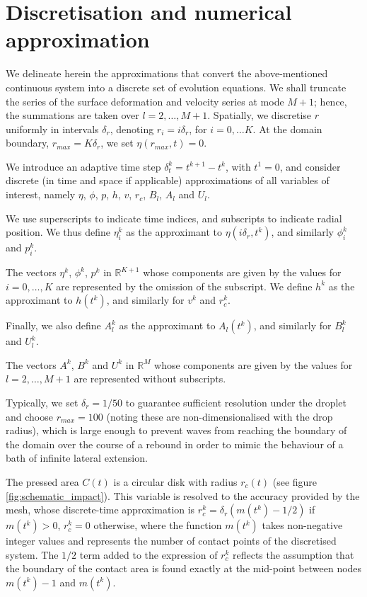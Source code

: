 \documentclass{jfm}
\begin{document}
\section{Discretisation and numerical approximation}
\label{sec:discretised_model}
We delineate herein the approximations that convert the above-mentioned continuous system into a discrete set of evolution equations. We shall truncate the series of the surface deformation and velocity series at mode $M+1$; hence, the summations are taken over $l=2,\ldots,M+1$. Spatially, we discretise $r$  uniformly in intervals $\delta_r$, denoting $r_i=i \delta_r$, for $i=0,\ldots K$. At the domain boundary, $r_{max} = K \delta_r$,  we set $\eta(r_{max}, t) = 0$.

We introduce an adaptive time step $\delta^k_t = t^{k+1} - t^{k}$, with $t^1 = 0$, and consider discrete (in time and space if applicable) approximations of all variables of interest, namely $\eta$, $\phi$, $p$, $h$, $v$, $r_c$, $B_l$, $A_l$ and $U_l$. 

We use superscripts to indicate time indices, and subscripts to indicate radial position. 
We thus define $\eta^k_i$ as the approximant to $\eta(i\delta_r,t^k)$, and similarly $\phi^k_i$ and $p^k_i$. 

The vectors $\eta^k$, $\phi^k$, $p^k$ in $\mathbb{R}^{K+1}$ whose components are given by the values for $i=0,\ldots,K$ are represented by the omission of the subscript. We define $h^k$ as the approximant to $h(t^k)$, and similarly for $v^k$ and $r_c^k$. 

Finally, we also define $A^k_l$ as the approximant to $A_l(t^k)$, and similarly for $B_l^k$ and $U^k_l$.

The vectors $A^k$, $B^k$ and $U^k$ in $\mathbb{R}^{M}$ whose components are given by the values for $l = 2,\ldots,M+1$ are represented without subscripts. %

Typically, we set $\delta_r = 1/50$ to guarantee sufficient resolution under the droplet and choose $r_{max}=100$ (noting these are non-dimensionalised with the drop radius), which is large enough to prevent waves from reaching the boundary of the domain over the course of a rebound in order to mimic the behaviour of a bath of infinite lateral extension.

The pressed area $C(t)$ is a circular disk with radius $r_c(t)$ (see figure \ref{fig:schematic_impact}). This variable is resolved to the accuracy provided by the mesh, whose discrete-time approximation is $r_c^k = \delta_r(m(t^k) - 1/2) $ if $m(t^k) > 0$, $r^k_c = 0$ otherwise, where the function $m(t^k)$ takes non-negative integer values and represents the number of contact points of the discretised system. The $1/2$ term added to the expression of $r^k_c$ reflects the assumption that the boundary of the contact area is found exactly at the mid-point between nodes $m(t^k)-1$ and $m(t^k)$.
\end{document}
